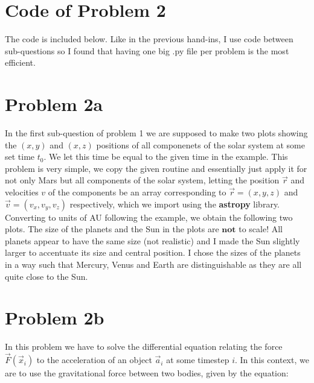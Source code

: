 \section*{Code of Problem 2}

The code is included below. Like in the previous hand-ins, I use code between sub-questions so I found that having one big .py file per problem is the most efficient.
%

\section*{Problem 2a}

In the first sub-question of problem 1 we are supposed to make two plots showing the $(x,y)$ and $(x,z)$ positions of all componenets of the solar system at some set time $t_0$. We let this time be equal to the given time in the example. This problem is very simple, we copy the given routine and essentially just apply it for not only Mars but all components of the solar system, letting the position $\vec{r}$ and velocities ${v}$ of the components be an array corresponding to $\vec{r} = (x,y,z)$ and $\vec{v} = (v_x,v_y,v_z)$ respectively, which we import using the \textbf{astropy} library. Converting to units of AU following the example, we obtain the following two plots. The size of the planets and the Sun in the plots are $\textbf{not}$ to scale! All planets appear to have the same size (not realistic) and I made the Sun slightly larger to accentuate its size and central position. I chose the sizes of the planets in a way such that Mercury, Venus and Earth are distinguishable as they are all quite close to the Sun. 



\section*{Problem 2b}

In this problem we have to solve the differential equation relating the force $\vec{F}(\vec{x}_i)$ to the acceleration of an object $\vec{a}_i$ at some timestep $i$. In this context, we are to use the gravitational force between two bodies, given by the equation:\\

